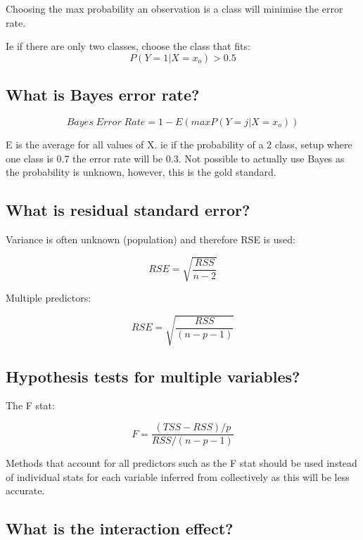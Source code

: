 \documentclass[11pt]{scrartcl} %
\begin{document}
Choosing the max probability an observation is a class will minimise the error rate.

Ie if there are only two classes, choose the class that fits:
\begin{equation}
	P(Y=1|X=x_o) > 0.5
\end{equation}

\subsection{What is Bayes error rate?}

\begin{equation}
	Bayes\; Error\; Rate = 1 - E(maxP(Y=j|X=x_o))
\end{equation}

E is the average for all values of X. ie if the probability of a 2 class, setup where one class is 0.7 the error rate
will be 0.3. Not possible to actually use Bayes as the probability is unknown, however, this is the gold standard.

\subsection{What is residual standard error?}

Variance is often unknown (population) and therefore RSE is used:

\begin{equation}
	RSE = \sqrt{\frac{RSS}{n-2}}
\end{equation}

Multiple predictors:

\begin{equation}
	RSE = \sqrt{\frac{RSS}{(n-p-1)}}
\end{equation}

\subsection{Hypothesis tests for multiple variables?}

The F stat:

\begin{equation}
	F=\frac{(TSS-RSS)/p}{RSS/(n-p-1)}
\end{equation}

Methods that account for all predictors such as the F stat should be used instead of individual
stats for each variable inferred from collectively as this will be less accurate.

\subsection{What is the interaction effect?}
\end{document}
